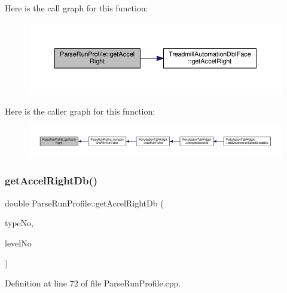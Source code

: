 Here is the call graph for this function\+:
\nopagebreak
\begin{figure}[H]
\begin{center}
\leavevmode
\includegraphics[width=350pt]{class_parse_run_profile_af5cde00690cd8d72674d713890d2e5a1_cgraph}
\end{center}
\end{figure}
Here is the caller graph for this function\+:
\nopagebreak
\begin{figure}[H]
\begin{center}
\leavevmode
\includegraphics[width=350pt]{class_parse_run_profile_af5cde00690cd8d72674d713890d2e5a1_icgraph}
\end{center}
\end{figure}
\mbox{\label{class_parse_run_profile_a526525e13096922f1523c2b6fb4ab802}} 
\subsubsection{\texorpdfstring{get\+Accel\+Right\+Db()}{getAccelRightDb()}}
{\footnotesize\ttfamily double Parse\+Run\+Profile\+::get\+Accel\+Right\+Db (\begin{DoxyParamCaption}\item[{Q\+String}]{type\+No,  }\item[{Q\+String}]{level\+No }\end{DoxyParamCaption})}



Definition at line 72 of file Parse\+Run\+Profile.\+cpp.

